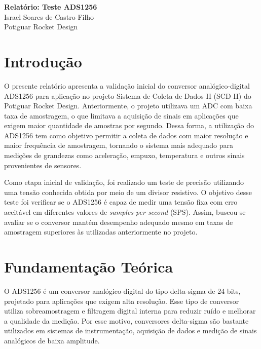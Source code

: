 \documentclass[12pt, a4paper]{article}
\begin{document}
\begin{titlepage}
    \vspace*{\fill}
    \begin{center}
        {\Huge\bfseries Relatório: Teste ADS1256}\\[0.5cm]
        {\Large Israel Soares de Castro Filho}\\[0.4cm]
        \vspace{1cm}
        {\Large Potiguar Rocket Design}\\[0.4cm]
    \end{center}
    \vspace*{\fill}
\end{titlepage}

\section{Introdução}

O presente relatório apresenta a validação inicial do conversor analógico-digital ADS1256 para aplicação no projeto Sistema de Coleta de Dados II (SCD II) do Potiguar Rocket Design. 
Anteriormente, o projeto utilizava um ADC com baixa taxa de amostragem, o que limitava a aquisição de sinais em aplicações que exigem maior quantidade de amostras por segundo. 
Dessa forma, a utilização do ADS1256 tem como objetivo permitir a coleta de dados com maior resolução e maior frequência de amostragem, 
tornando o sistema mais adequado para medições de grandezas como aceleração, empuxo, temperatura e outros sinais provenientes de sensores.

Como etapa inicial de validação, foi realizado um teste de precisão utilizando uma tensão conhecida obtida por meio de um divisor resistivo. 
O objetivo desse teste foi verificar se o ADS1256 é capaz de medir uma tensão fixa com erro aceitável em diferentes valores de \textit{samples-per-second} (SPS). 
Assim, buscou-se avaliar se o conversor mantém desempenho adequado mesmo em taxas de amostragem superiores às utilizadas anteriormente no projeto.

\section{Fundamentação Teórica}

O ADS1256 é um conversor analógico-digital do tipo delta-sigma de 24 bits, projetado para aplicações que exigem alta resolução. 
Esse tipo de conversor utiliza sobreamostragem e filtragem digital interna para reduzir ruído e melhorar a qualidade da medição. 
Por esse motivo, conversores delta-sigma são bastante utilizados em sistemas de instrumentação, aquisição de dados e medição de sinais analógicos de baixa amplitude.
\end{document}
